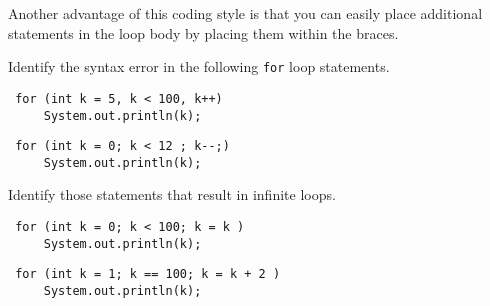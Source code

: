 \noindent Another advantage of this coding style is that you
can easily place additional statements in the loop body by placing
them within the braces.


\label{self-study-exercises}
\begin{SSTUDY}
\item  Identify the syntax error in the following {\tt for} loop \mbox{statements.}
\begin{EXRLL}
\item 

\begin{jjjlisting}
\begin{lstlisting}
 for (int k = 5, k < 100, k++)
     System.out.println(k);
\end{lstlisting}
\end{jjjlisting}

\item 

\begin{jjjlisting}
\begin{lstlisting}
 for (int k = 0; k < 12 ; k--;)
     System.out.println(k);
\end{lstlisting}
\end{jjjlisting}

\end{EXRLL}

\item  Identify those statements that result in infinite loops.
\begin{EXRLL}
\item 

\begin{jjjlisting}
\begin{lstlisting}
 for (int k = 0; k < 100; k = k )
     System.out.println(k);
\end{lstlisting}
\end{jjjlisting}


\item 

\begin{jjjlisting}
\begin{lstlisting}
 for (int k = 1; k == 100; k = k + 2 )
     System.out.println(k);
\end{lstlisting}
\end{jjjlisting}



\end{EXRLL}
\end{SSTUDY}
